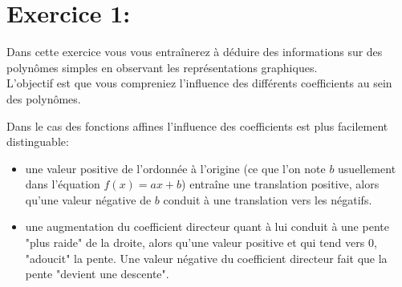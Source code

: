 \documentclass[11pt, french]{article}
\begin{document}
\section*{Exercice 1:}
Dans cette exercice vous vous entraînerez à déduire des informations sur des polynômes simples en observant les représentations graphiques.\\
L'objectif est que vous compreniez l'influence des différents coefficients au sein des polynômes.


Dans le cas des fonctions affines l'influence des coefficients est plus facilement distinguable:
\begin{itemize}
    \item une valeur positive de l'ordonnée à l'origine (ce que l'on note $b$ usuellement dans l'équation $f(x) = ax+b$) entraîne une translation positive, alors qu'une valeur négative de $b$ conduit à une translation vers les négatifs.
    \item une augmentation du coefficient directeur quant à lui conduit à une pente "plus raide" de la droite, alors qu'une valeur positive et qui tend vers $0$, "adoucit" la pente. Une valeur négative du coefficient directeur fait que la pente "devient une descente".
\end{itemize}
\end{document}
